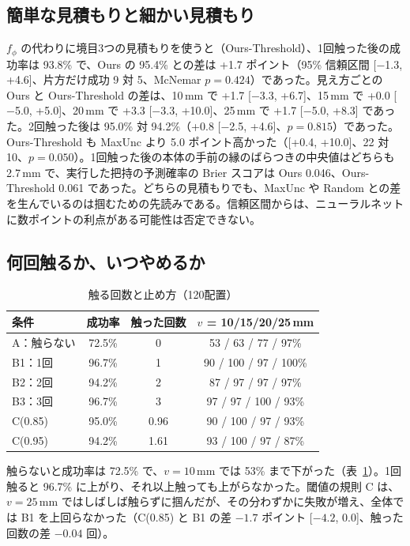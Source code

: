 \documentclass[conference]{IEEEtran}
\newcommand{\Ours}{Ours}
\newcommand{\Unc}{MaxUnc}
\newcommand{\Rand}{Random}
\newcommand{\Geom}{Ours-Threshold}
\begin{document}
\subsection{簡単な見積もりと細かい見積もり}\label{sec:geom}
$f_\phi$ の代わりに境目3つの見積もりを使うと（\Geom）、1回触った後の成功率は 93.8\% で、\Ours{} の 95.4\% との差は +1.7 ポイント（95\% 信頼区間 [$-$1.3, +4.6]、片方だけ成功 9 対 5、McNemar $p=0.424$）であった。見え方ごとの \Ours{} と \Geom{} の差は、10\,mm で +1.7 [$-$3.3, +6.7]、15\,mm で +0.0 [$-$5.0, +5.0]、20\,mm で +3.3 [$-$3.3, +10.0]、25\,mm で +1.7 [$-$5.0, +8.3] であった。2回触った後は 95.0\% 対 94.2\%（+0.8 [$-$2.5, +4.6]、$p=0.815$）であった。\Geom{} も \Unc{} より 5.0 ポイント高かった（[+0.4, +10.0]、22 対 10、$p=0.050$）。1回触った後の本体の手前の縁のばらつきの中央値はどちらも 2.7\,mm で、実行した把持の予測確率の Brier スコアは \Ours{} 0.046、\Geom{} 0.061 であった。どちらの見積もりでも、\Unc{} や \Rand{} との差を生んでいるのは掴むための先読みである。信頼区間からは、ニューラルネットに数ポイントの利点がある可能性は否定できない。

\subsection{何回触るか、いつやめるか}

\begin{table}[t]
\caption{触る回数と止め方（120配置）}
\label{tab:count}
\centering
\small
\begin{tabular}{@{}lccc@{}}
\toprule
条件 & 成功率 & 触った回数 & $v$ = 10/15/20/25\,mm \\
\midrule
A：触らない & 72.5\% & 0 & 53 / 63 / 77 / 97\% \\
B1：1回 & 96.7\% & 1 & 90 / 100 / 97 / 100\% \\
B2：2回 & 94.2\% & 2 & 87 / 97 / 97 / 97\% \\
B3：3回 & 96.7\% & 3 & 97 / 97 / 100 / 93\% \\
C(0.85) & 95.0\% & 0.96 & 90 / 100 / 97 / 93\% \\
C(0.95) & 94.2\% & 1.61 & 93 / 100 / 97 / 87\% \\
\bottomrule
\end{tabular}
\end{table}

触らないと成功率は 72.5\% で、$v=10$\,mm では 53\% まで下がった（表~\ref{tab:count}）。1回触ると 96.7\% に上がり、それ以上触っても上がらなかった。閾値の規則 C は、$v=25$\,mm ではしばしば触らずに掴んだが、その分わずかに失敗が増え、全体では B1 を上回らなかった（C(0.85) と B1 の差 $-1.7$ ポイント [$-4.2$, 0.0]、触った回数の差 $-0.04$ 回）。
\end{document}
